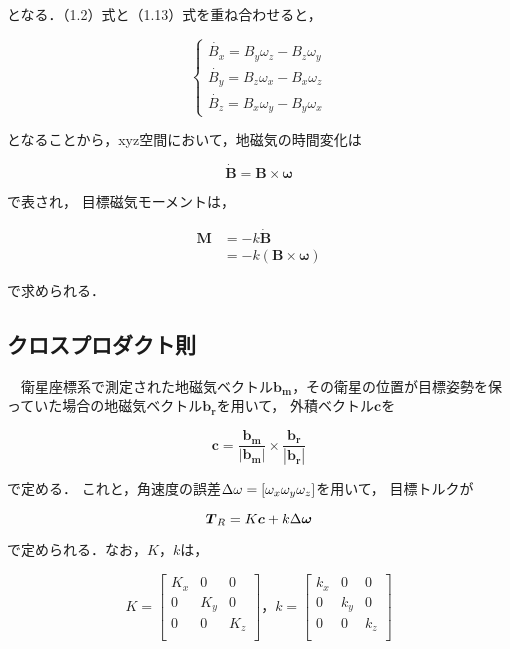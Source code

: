 となる．（1.2）式と（1.13）式を重ね合わせると，

\begin{equation}
    \left\{
        \begin{aligned}
            \dot{B_x} = B_y\omega_z - B_z\omega_y\\
            \dot{B_y} = B_z\omega_x - B_x\omega_z\\
            \dot{B_z} = B_x\omega_y - B_y\omega_x
        \end{aligned}
    \right.
\end{equation}

となることから，xyz空間において，地磁気の時間変化は

\begin{equation}
    \boldsymbol{\dot{B} = B \times \omega}
\end{equation}

で表され，
目標磁気モーメントは，

\begin{equation}
    \begin{aligned}
        \boldsymbol{M} &= -k \boldsymbol{\dot{B}}\\
                       &= -k(\boldsymbol{B \times \omega})
    \end{aligned}
\end{equation}

で求められる．

\subsection{クロスプロダクト則}
　衛星座標系で測定された地磁気ベクトル$\boldsymbol{b_m}$，その衛星の位置が目標姿勢を保っていた場合の地磁気ベクトル$\boldsymbol{b_r}$を用いて，
外積ベクトル$\boldsymbol{c}$を

\begin{equation}
    \boldsymbol{c} = \boldsymbol{\frac{b_m}{|b_m|}\times\frac{b_r}{|b_r|}}
\end{equation}

で定める．
これと，角速度の誤差$\Delta\omega = [\omega_x\space\omega_y\space\omega_z]$を用いて，
目標トルクが

\begin{equation}
    \boldsymbol{T}_R = K\boldsymbol{c}+k\Delta\boldsymbol{\omega}\\
\end{equation}

で定められる．なお，$K，k$は，

\begin{equation}
    K = 
    \begin{bmatrix}
        K_x & 0 & 0 \\
        0 & K_y & 0 \\
        0 & 0 & K_z \\
    \end{bmatrix}
    ，k =
    \begin{bmatrix}
        k_x & 0 & 0 \\
        0 & k_y & 0 \\
        0 & 0 & k_z \\
    \end{bmatrix}
\end{equation}

